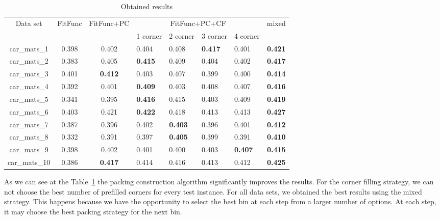 \documentclass[12pt]{llncs}
\begin{document}
\begin{table}[]
\caption{Obtained results}\label{table_results}
    \begin{center}
    \begin{tabularx}{400pt}{c|c|c|XXXX|c}
    \hline
    Data set& FitFunc & FitFunc+PC &\multicolumn{4}{c|}{ FitFunc+PC+CF } & mixed\\
    &&&1 corner& 2 corner& 3 corner& 4 corner&\\[0.3cm]\hline
    car\_mats\_1& 0.398 & 0.402 & 0.404 & 0.408 & \textbf{0.417} & 0.401 & \textbf{0.421} \\ [0.3cm]
    car\_mats\_2& 0.383 & 0.405 &\textbf{ 0.415} & 0.409 & 0.404 & 0.402 & \textbf{0.417}\\ [0.3cm]
    car\_mats\_3& 0.401 &\textbf{0.412} & 0.403 & 0.407& 0.399 & 0.400 & \textbf{0.414} \\ [0.3cm]
    car\_mats\_4& 0.392 & 0.401 & \textbf{0.409} & 0.403 & 0.408 & 0.407 & \textbf{0.416} \\ [0.3cm]
    car\_mats\_5& 0.341 & 0.395 & \textbf{0.416} & 0.415& 0.403 & 0.409 &\textbf{ 0.419} \\ [0.3cm]
    car\_mats\_6& 0.403 & 0.421 & \textbf{0.422} & 0.418 & 0.413 & 0.413 & \textbf{0.427} \\ [0.3cm]
    car\_mats\_7& 0.387 & 0.396 & 0.402 & \textbf{0.403} & 0.396& 0.401 & \textbf{0.412}\\ [0.3cm]
    car\_mats\_8& 0.332 & 0.391 & 0.397 & \textbf{0.405} & 0.399 & 0.391 & \textbf{0.410} \\ [0.3cm]
    car\_mats\_9& 0.398 & 0.402 & 0.401 & 0.400 & 0.403 & \textbf{0.407} & \textbf{0.415} \\ [0.3cm]
    car\_mats\_10& 0.386 & \textbf{0.417} & 0.414 & 0.416& 0.413 & 0.412 & \textbf{0.425} \\
[0.3cm]\hline
    \end{tabularx}
    \end{center}
\end{table}

As we can see at the Table~\ref{table_results} the packing construction algorithm significantly improves the results. For the corner filling strategy, we can not choose the best number of prefilled corners for every test instance. For all data sets, we obtained the best results using the mixed strategy. This happens because we have the opportunity to select the best bin at each step from a larger number of options. At each step, it may choose the best packing strategy for the next bin.
\end{document}
